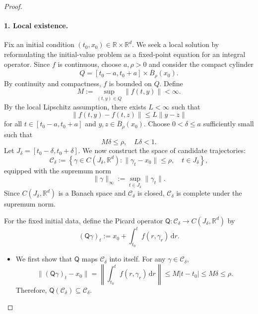 \documentclass[12pt,a4paper,oneside]{book}
\begin{document}
\begin{proof}

\paragraph{1. Local existence.}

Fix an initial condition $(t_0,x_0)\in \mathbb R\times\mathbb R^d$. We seek a local solution by reformulating the initial-value
problem as a fixed-point equation for an integral operator. Since $f$ is continuous, choose $a,\rho>0$ and consider the
compact cylinder
\begin{equation*}
    Q=[t_0-a,t_0+a]\times\overline B_\rho(x_0).
\end{equation*}
By continuity and compactness, $f$ is bounded on $Q$. Define
\begin{equation*}
    M := \sup_{(t,y)\in Q}\|f(t,y)\|<\infty.
\end{equation*}
By the local Lipschitz assumption, there exists $L<\infty$ such that
\begin{equation*}
    \|f(t,y)-f(t,z)\| \leq L\|y-z\|
\end{equation*}
for all $t\in[t_0-a,t_0+a]$ and $y,z\in\overline B_\rho(x_0)$. Choose $0<\delta\leq a$ sufficiently small such that
\begin{equation*}
    M\delta\leq\rho, \quad L\delta<1.
\end{equation*}
Let $J_\delta=[t_0-\delta,t_0+\delta]$. We now construct the space of candidate trajectories:
\begin{equation*}
    \mathcal C_\delta :=
    \left\{
        \gamma\in C(J_\delta,\mathbb R^d): \|\gamma_t-x_0\|\leq\rho,\quad t\in J_\delta
    \right\},
\end{equation*}
equipped with the supremum norm
\begin{equation*}
    \|\gamma\|_\infty := \sup_{t\in J_\delta}\|\gamma_t\|.
\end{equation*}
Since $C(J_\delta,\mathbb R^d)$ is a Banach space and $\mathcal C_\delta$ is closed, $\mathcal C_\delta$ is complete under
the supremum norm.

For the fixed initial data, define the Picard operator $\mathsf Q: \mathcal C_\delta\longrightarrow C(J_\delta,\mathbb R^d)$
by
\begin{equation*}
    (\mathsf Q\gamma)_t := x_0+\int_{t_0}^{t}f(r,\gamma_r)\,\mathrm dr.
\end{equation*}
\begin{itemize}
    \item We first show that $\mathsf Q$ maps $\mathcal C_\delta$ into itself. For any $\gamma\in\mathcal C_\delta$,
        \begin{equation*}
            \|(\mathsf Q\gamma)_t-x_0\| =
                \left\|
                    \int_{t_0}^{t}f(r,\gamma_r)\,\mathrm dr
                \right\|
                \leq M|t-t_0|
                \leq M\delta
                \leq \rho.
        \end{equation*}
        Therefore, $\mathsf Q(\mathcal C_\delta) \subseteq\mathcal C_\delta$.


\end{itemize}
\end{proof}
\end{document}
